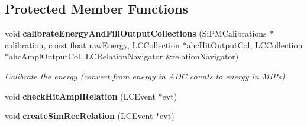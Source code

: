 \subsection*{Protected Member Functions}
\begin{DoxyCompactItemize}
\item 
void {\bf calibrate\-Energy\-And\-Fill\-Output\-Collections} (Si\-P\-M\-Calibrations $\ast$calibration, const float raw\-Energy, L\-C\-Collection $\ast$ahc\-Hit\-Output\-Col, L\-C\-Collection $\ast$ahc\-Ampl\-Output\-Col, L\-C\-Relation\-Navigator \&relation\-Navigator)
\begin{DoxyCompactList}\small\item\em Calibrate the energy (convert from energy in A\-D\-C counts to energy in M\-I\-Ps) \end{DoxyCompactList}\item 
void {\bfseries check\-Hit\-Ampl\-Relation} (L\-C\-Event $\ast$evt)\label{classCALICE_1_1SiPMCalibrateProcessor_a0cab17864ce6d8d19c045a2f29d3f385}

\item 
void {\bfseries create\-Sim\-Rec\-Relation} (L\-C\-Event $\ast$evt)\label{classCALICE_1_1SiPMCalibrateProcessor_aaac485a2a610b1a3170f3ae697df5e66}

\end{DoxyCompactItemize}
